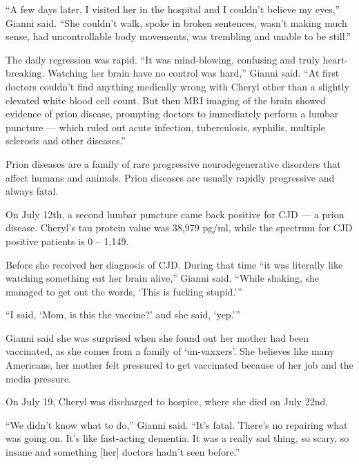 {“A few days later, I visited her in the hospital and I couldn’t believe my
eyes,” Gianni said. “She couldn’t walk, spoke in broken sentences, wasn’t making
much sense, had uncontrollable body movements, was trembling and unable to be
still.”

The daily regression was rapid. “It was mind-blowing, confusing and truly
heart-breaking. Watching her brain have no control was hard,” Gianni said. “At
first doctors couldn’t find anything medically wrong with Cheryl other than a
slightly elevated white blood cell count. But then MRI imaging of the brain
showed evidence of prion disease, prompting doctors to immediately perform a
lumbar puncture — which ruled out acute infection, tuberculosis, syphilis,
multiple sclerosis and other diseases.”

Prion diseases are a family of rare progressive neurodegenerative disorders that
affect humans and animals. Prion diseases are usually rapidly progressive and
always fatal.

On July 12th, a second lumbar puncture came back positive for CJD — a prion
disease. Cheryl’s tau protein value was 38,979 pg/ml, while the spectrum for CJD
positive patients is 0 – 1,149.

Before she received her diagnosis of CJD. During that time “it was literally
like watching something eat her brain alive,” Gianni said. “While shaking, she
managed to get out the words, ‘This is fucking stupid.’”

“I said, ‘Mom, is this the vaccine?’ and she said, ‘yep.’”

Gianni said she was surprised when she found out her mother had been vaccinated,
as she comes from a family of ‘un-vaxxers’. She believes like many Americans,
her mother felt pressured to get vaccinated because of her job and the media
pressure.

On July 19, Cheryl was discharged to hospice, where she died on July 22nd.

“We didn’t know what to do,” Gianni said. “It’s fatal. There’s no repairing what
was going on. It’s like fast-acting dementia. It was a really sad thing, so
scary, so insane and something [her] doctors hadn’t seen before.”

}
